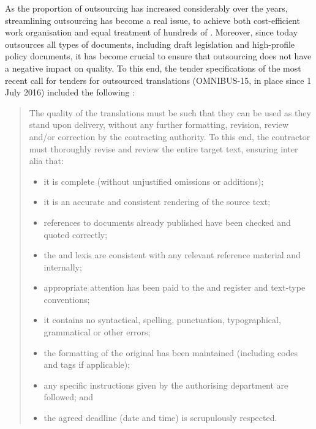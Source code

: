 \documentclass[output=paper]{langsci/langscibook}
\begin{document}
As the proportion of outsourcing has increased considerably over the years, streamlining outsourcing has become a real issue, to achieve both cost-efficient work organisation and equal treatment of hundreds of . Moreover, since  today outsources all types of documents, including draft legislation and high-profile policy documents, it has become crucial to ensure {that outsourcing does not have a negative impact on quality. To this end, the tender specifications of the most recent call for tenders for outsourced translations (OMNIBUS-15, in place since 1 July 2016) included the following :}

\begin{quotation} The quality of the translations must be such that they can be used as they stand upon delivery, without any further formatting, revision, review and/or correction by the contracting authority. To this end, the contractor must thoroughly revise and review the entire target text, ensuring inter alia that:
\begin{itemize}
\item    
it is complete (without unjustified omissions or additions);

\item   
it is an accurate and consistent rendering of the source text;

\item  
references to documents already published have been checked and quoted correctly;

\item  
the  and lexis are consistent with any relevant reference material and internally;

\item  
appropriate attention has been paid to the  and register and text-type conventions;

\item  
it contains no syntactical, spelling, punctuation, typographical, grammatical or other errors; 

\item  
the formatting of the original has been maintained (including codes and tags if applicable);

\item  
any specific instructions given by the authorising department are followed; and

\item  
the agreed deadline (date and time) is scrupulously respected.
\end{itemize}
\end{quotation}
\end{document}
